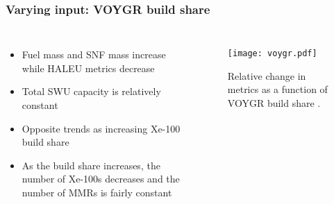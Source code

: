 \begin{frame}
    \frametitle{Varying input: VOYGR build share}
    \begin{columns}
        \column{4.5cm}
            \begin{itemize}
                \item Fuel mass and SNF mass increase while \gls{HALEU}
                      metrics decrease 
                \item Total SWU capacity is relatively constant
                \item Opposite trends as increasing Xe-100 build share
                \item As the build share increases, the number of Xe-100s
                      decreases and the number of MMRs is fairly constant
                
            \end{itemize}
        \column{6.5cm}
        \begin{figure}
            \centering 
            \texttt{[image: voygr.pdf]}
            \caption{Relative change in metrics as a function 
            of VOYGR build share \protect\cite{bachmann_sensitivity_2022}.}
            \label{fig:voygr}
        \end{figure}
    \end{columns}
\end{frame}